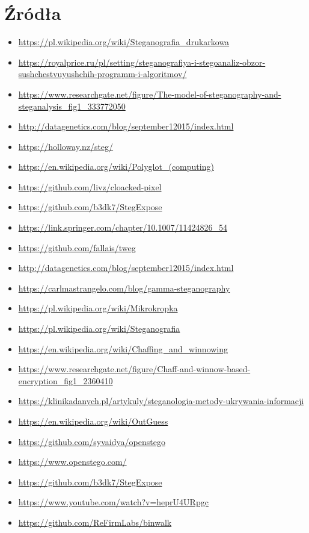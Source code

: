 \documentclass{article}
\begin{document}
\section{Źródła}
\begin{itemize}
	\item \url{https://pl.wikipedia.org/wiki/Steganografia_drukarkowa}
	\item \url{https://royalprice.ru/pl/setting/steganografiya-i-stegoanaliz-obzor-sushchestvuyushchih-programm-i-algoritmov/}
	\item \url{https://www.researchgate.net/figure/The-model-of-steganography-and-steganalysis_fig1_333772050}
	\item \url{http://datagenetics.com/blog/september12015/index.html}
	\item \url{https://holloway.nz/steg/}
	\item \url{https://en.wikipedia.org/wiki/Polyglot_(computing)}
	\item \url{https://github.com/livz/cloacked-pixel}
	\item \url{https://github.com/b3dk7/StegExpose}
	\item \url{https://link.springer.com/chapter/10.1007/11424826_54}
	\item \url{https://github.com/fallais/tweg}
	\item \url{http://datagenetics.com/blog/september12015/index.html}
	\item \url{https://carlmastrangelo.com/blog/gamma-steganography}
	\item \url{https://pl.wikipedia.org/wiki/Mikrokropka}
	\item \url{https://pl.wikipedia.org/wiki/Steganografia}
	\item \url{https://en.wikipedia.org/wiki/Chaffing_and_winnowing}
	\item \url{https://www.researchgate.net/figure/Chaff-and-winnow-based-encryption_fig1_2360410}
	\item \url{https://klinikadanych.pl/artykuly/steganologia-metody-ukrywania-informacji}
         \item \url{https://en.wikipedia.org/wiki/OutGuess}
         \item \url{https://github.com/syvaidya/openstego}
         \item \url{https://www.openstego.com/}
         \item \url{https://github.com/b3dk7/StegExpose}
         \item \url{https://www.youtube.com/watch?v=heprU4URpgc}
         \item \url{https://github.com/ReFirmLabs/binwalk}  
\end{itemize}
\end{document}
